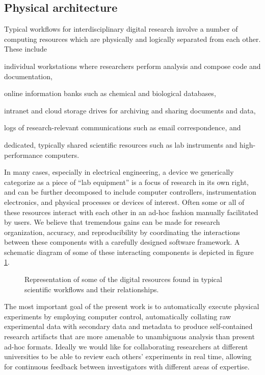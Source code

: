 \documentclass[../thesis]{subfiles}
\begin{document}
\subsection{Physical architecture}
Typical workflows for interdisciplinary digital research involve a
number of computing resources which are physically and logically
separated from each other. These include
\begin{enumerate*}[label=(\roman*)]
  \item{
      individual workstations where researchers perform analysis and
      compose code and documentation,
  }
  \item{
      online information banks such as chemical and biological
      databases,
  }
  \item{
      intranet and cloud storage drives for archiving and sharing
      documents and data,
  }
  \item{
      logs of research-relevant communications such as email
      correspondence, and
  }
  \item{
      dedicated, typically shared scientific resources such as lab
      instruments and high-performance computers.
  }
\end{enumerate*}
In many cases, especially in electrical engineering, a
device we generically categorize as a piece of ``lab equipment'' is a
focus of research in its own right, and can be further decomposed to
include computer controllers, instrumentation electronics, and
physical processes or devices of interest. Often some or all of these
resources interact with each other in an ad-hoc fashion manually
facilitated by users. We believe that tremendous gains can be made for
research organization, accuracy, and reproducibility by coordinating
the interactions between these components with a carefully designed
software framework. A schematic diagram of some of these interacting
components is depicted in figure \ref{fig:PhysArch}.

\begin{figure}
  \caption{
    Representation of some of the digital resources found in typical
    scientific workflows and their relationships.
    \label{fig:PhysArch}
  }
\end{figure}

The most important goal of the present work is to automatically
execute physical experiments by employing computer control,
automatically collating raw experimental data with secondary data and
metadata to produce self-contained research artifacts that are more
amenable to unambiguous analysis than present ad-hoc formats.
Ideally we would like for collaborating researchers at different
universities to be able to review each others' experiments in real
time, allowing for continuous feedback between investigators with
different areas of expertise.
\end{document}
